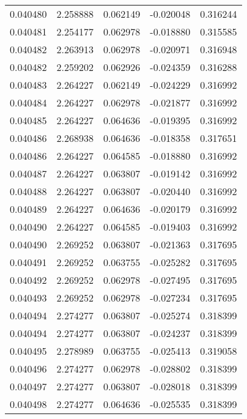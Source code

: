 \begin{tabular}{lrrrr}
0.040480    &  2.258888 &  0.062149 & -0.020048 &             0.316244 \\
0.040481    &  2.254177 &  0.062978 & -0.018880 &             0.315585 \\
0.040482    &  2.263913 &  0.062978 & -0.020971 &             0.316948 \\
0.040482    &  2.259202 &  0.062926 & -0.024359 &             0.316288 \\
0.040483    &  2.264227 &  0.062149 & -0.024229 &             0.316992 \\
0.040484    &  2.264227 &  0.062978 & -0.021877 &             0.316992 \\
0.040485    &  2.264227 &  0.064636 & -0.019395 &             0.316992 \\
0.040486    &  2.268938 &  0.064636 & -0.018358 &             0.317651 \\
0.040486    &  2.264227 &  0.064585 & -0.018880 &             0.316992 \\
0.040487    &  2.264227 &  0.063807 & -0.019142 &             0.316992 \\
0.040488    &  2.264227 &  0.063807 & -0.020440 &             0.316992 \\
0.040489    &  2.264227 &  0.064636 & -0.020179 &             0.316992 \\
0.040490    &  2.264227 &  0.064585 & -0.019403 &             0.316992 \\
0.040490    &  2.269252 &  0.063807 & -0.021363 &             0.317695 \\
0.040491    &  2.269252 &  0.063755 & -0.025282 &             0.317695 \\
0.040492    &  2.269252 &  0.062978 & -0.027495 &             0.317695 \\
0.040493    &  2.269252 &  0.062978 & -0.027234 &             0.317695 \\
0.040494    &  2.274277 &  0.063807 & -0.025274 &             0.318399 \\
0.040494    &  2.274277 &  0.063807 & -0.024237 &             0.318399 \\
0.040495    &  2.278989 &  0.063755 & -0.025413 &             0.319058 \\
0.040496    &  2.274277 &  0.062978 & -0.028802 &             0.318399 \\
0.040497    &  2.274277 &  0.063807 & -0.028018 &             0.318399 \\
0.040498    &  2.274277 &  0.064636 & -0.025535 &             0.318399 \\

\end{tabular}
